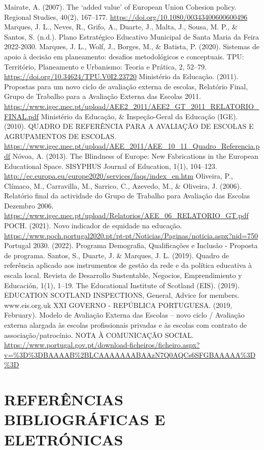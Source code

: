 \documentclass[
]{book}
\begin{document}
Mairate, A. (2007). The `added value' of European Union Cohesion policy. Regional Studies, 40(2), 167--177. \url{https://doi.org/10.1080/00343400600600496}
Marques, J. L., Neves, R., Grifo, A., Duarte, J., Malta, J., Sousa, M. P., \& Santos, S. (n.d.). Plano Estratégico Educativo Municipal de Santa Maria da Feira 2022-2030.
Marques, J. L., Wolf, J., Borges, M., \& Batista, P. (2020). Sistemas de apoio à decisão em planeamento: desafios metodológicos e conceptuais. TPU: Território, Planeamento e Urbanismo: Teoria e Prática, 2, 52--79. \url{https://doi.org/10.34624/TPU.V0I2.23720}
Ministério da Educação. (2011). Propostas para um novo ciclo de avaliação externa de escolas, Relatório Final, Grupo de Trabalho para a Avaliação Externa das Escolas 2011. \url{https://www.igec.mec.pt/upload/AEE2_2011/AEE2_GT_2011_RELATORIO_FINAL.pdf}
Ministério da Educação, \& Inspeção-Geral da Educação (IGE). (2010). QUADRO DE REFERÊNCIA PARA A AVALIAÇÃO DE ESCOLAS E AGRUPAMENTOS DE ESCOLAS. \url{https://www.igec.mec.pt/upload/AEE_2011/AEE_10_11_Quadro_Referencia.pdf}
Nóvoa, A. (2013). The Blindness of Europe: New Fabrications in the European Educational Space. SISYPHUS Journal of Education, 1(1), 104--123. \url{http://ec.europa.eu/europe2020/services/faqs/index_en.htm}
Oliveira, P., Clímaco, M., Carravilla, M., Sarrico, C., Azevedo, M., \& Oliveira, J. (2006). Relatório final da actividade do Grupo de Trabalho para Avaliação das Escolas Dezembro 2006. \url{https://www.igec.mec.pt/upload/Relatorios/AEE_06_RELATORIO_GT.pdf}
POCH. (2021). Novo indicador de equidade na educação. \url{https://www.poch.portugal2020.pt/pt-pt/Noticias/Paginas/noticia.aspx?nid=750}
Portugal 2030. (2022). Programa Demografia, Qualificações e Inclusão - Proposta de programa.
Santos, S., Duarte, J. \& Marques, J. L. (2019). Quadro de referência aplicado aos instrumentos de gestão da rede e da política educativa à escala local. Revista de Desarrollo Sustentable, Negocios, Emprendimiento y Educación, 1(1), 1--19.
The Educational Institute of Scotland (EIS). (2019). EDUCATION SCOTLAND INSPECTIONS, General, Advice for members. www.eis.org.uk
XXI GOVERNO - REPÚBLICA PORTUGUESA. (2019, February). Modelo de Avaliação Externa das Escolas -- novo ciclo / Avaliação externa alargada às escolas profissionais privadas e às escolas com contrato de associação/patrocínio. NOTA À COMUNICAÇÃO SOCIAL. \url{https://www.portugal.gov.pt/download-ficheiros/ficheiro.aspx?v=\%3D\%3DBAAAAB\%2BLCAAAAAAABAAzN7Q0AQCs6SFGBAAAAA\%3D\%3D}

\hypertarget{referuxeancias-bibliogruxe1ficas-e-eletruxf3nicas}{%
\chapter*{REFERÊNCIAS BIBLIOGRÁFICAS E ELETRÓNICAS}\label{referuxeancias-bibliogruxe1ficas-e-eletruxf3nicas}}
\end{document}
